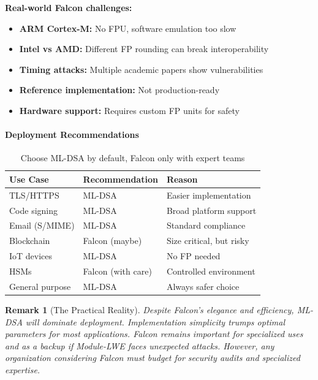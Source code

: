 \documentclass[11pt,a4paper]{article}
\newtheorem{remark}{Remark}
\begin{document}
\textbf{Real-world Falcon challenges:}
\begin{itemize}
    \item \textbf{ARM Cortex-M:} No FPU, software emulation too slow
    \item \textbf{Intel vs AMD:} Different FP rounding can break interoperability
    \item \textbf{Timing attacks:} Multiple academic papers show vulnerabilities
    \item \textbf{Reference implementation:} Not production-ready
    \item \textbf{Hardware support:} Requires custom FP units for safety
\end{itemize}

\paragraph{Deployment Recommendations}

\begin{table}[h]
\centering
\begin{tabular}{|l|l|l|}
\hline
\textbf{Use Case} & \textbf{Recommendation} & \textbf{Reason} \\
\hline
TLS/HTTPS & ML-DSA & Easier implementation \\
Code signing & ML-DSA & Broad platform support \\
Email (S/MIME) & ML-DSA & Standard compliance \\
Blockchain & Falcon (maybe) & Size critical, but risky \\
IoT devices & ML-DSA & No FP needed \\
HSMs & Falcon (with care) & Controlled environment \\
General purpose & ML-DSA & Always safer choice \\
\hline
\end{tabular}
\caption{Choose ML-DSA by default, Falcon only with expert teams}
\end{table}

\begin{remark}[The Practical Reality]
Despite Falcon's elegance and efficiency, ML-DSA will dominate deployment. Implementation simplicity trumps optimal parameters for most applications. Falcon remains important for specialized uses and as a backup if Module-LWE faces unexpected attacks. However, any organization considering Falcon must budget for security audits and specialized expertise.
\end{remark}
\end{document}
